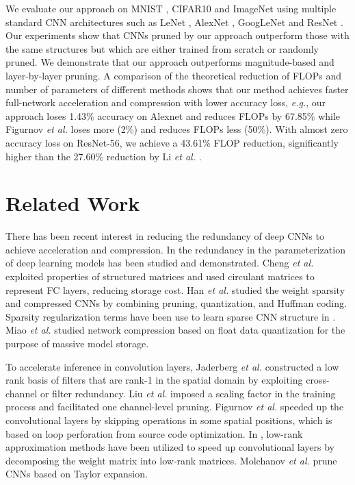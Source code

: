 \documentclass[10pt,twocolumn,letterpaper]{article}
\def\etal{\emph{et al.} }
\def\eg{\emph{e.g.}}
\begin{document}
We evaluate our approach on MNIST \cite{lenet}, CIFAR10 \cite{CIFAR10} and ImageNet \cite{imagenet_cvpr09} using multiple standard CNN architectures such as LeNet \cite{lenet}, AlexNet \cite{Alexnet}, GoogLeNet \cite{googlenet} and ResNet \cite{resnet}. 
Our experiments show that CNNs pruned by our approach outperform those with the same structures but which are either trained from scratch or randomly pruned. We demonstrate that our approach outperforms magnitude-based and layer-by-layer pruning. 
A comparison of the theoretical reduction of FLOPs and number of parameters of different methods shows that our method achieves faster full-network acceleration and compression with lower accuracy loss, \eg, our approach loses 1.43\% accuracy on Alexnet and reduces FLOPs by 67.85\% while Figurnov \etal\cite{PerforatedCNN} loses more (2\%) and reduces FLOPs less (50\%).  With almost zero accuracy loss on ResNet-56, we achieve a 43.61\% FLOP reduction, significantly higher than the 27.60\% reduction by Li \etal\cite{pruneweigth}.




\section{Related Work}%
There has been recent interest in reducing the redundancy of deep CNNs to achieve acceleration and compression. 
In \cite{PredictingParameters} the redundancy in the parameterization of deep learning models has been studied and demonstrated.
Cheng \emph{et al.}\cite{Circulant} exploited properties of structured matrices and used circulant matrices to represent FC layers, reducing storage cost. 
Han \emph{et al.}\cite{DeepCompress} studied the weight sparsity and compressed CNNs by combining pruning, quantization, and Huffman coding. Sparsity regularization terms have been use to learn sparse CNN structure in \cite{lasso,SSL,learning}. Miao \emph{et al.}\cite{miao-icde} studied network compression based on float data quantization for the purpose of massive model storage.

To accelerate inference in convolution layers, Jaderberg \emph{et al.}\cite{SeperableFilter} constructed a low rank basis of filters that are rank-1 in the spatial domain by exploiting cross-channel or filter redundancy.
Liu \emph{et al.}\cite{slimLiu} imposed a scaling factor in the training process and facilitated one channel-level pruning.
Figurnov \emph{et al.}\cite{PerforatedCNN} speeded up the convolutional layers by skipping operations in some spatial positions, which is based on loop perforation from source code optimization.
In \cite{DentonLeCun,Nonlinear,Tucker}, low-rank approximation methods have been utilized to speed up convolutional layers by decomposing the weight matrix into low-rank matrices. 
Molchanov \emph{et al.}\cite{Nvidia} prune CNNs based on Taylor expansion.
\end{document}
